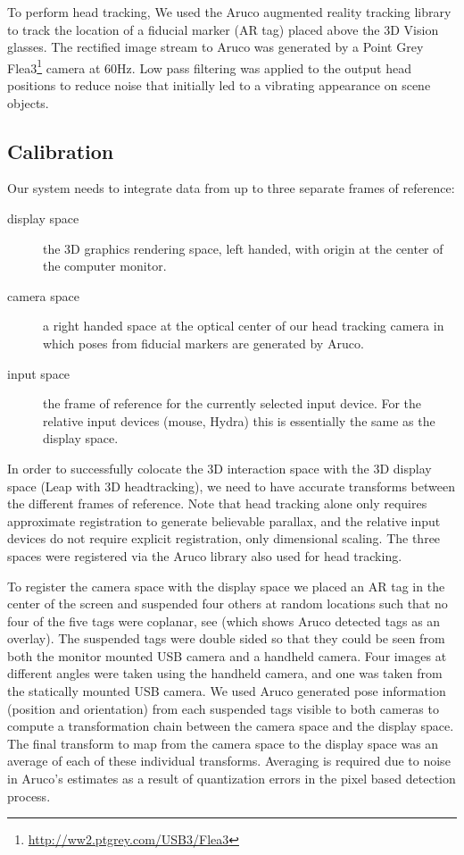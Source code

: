 To perform head tracking, We used the Aruco augmented reality tracking library
\cite{aruco} to track the location of a fiducial marker (AR tag) placed above
the 3D Vision glasses.  The rectified image stream to Aruco was generated by a
Point Grey Flea3\footnote{\url{http://ww2.ptgrey.com/USB3/Flea3}} camera at
60Hz.  Low pass filtering was applied to the output head positions to reduce
noise that initially led to a vibrating appearance on scene objects.

\subsection{Calibration}

Our system needs to integrate data from up to three separate frames of
reference:

\begin{description}

\item[display space] the 3D graphics rendering space, left handed, with origin
  at the center of the computer monitor.

\item[camera space] a right handed space at the optical center of our head
  tracking camera in which poses from fiducial markers are generated by Aruco.

\item[input space] the frame of reference for the currently selected input
  device.  For the relative input devices (mouse, Hydra) this is essentially
  the same as the display space.

\end{description}

In order to successfully colocate the 3D interaction space with the 3D display
space (Leap with 3D headtracking), we need to have accurate transforms between
the different frames of reference.  Note that head tracking alone only
requires approximate registration to generate believable parallax, and the
relative input devices do not require explicit registration, only dimensional
scaling. The three spaces were registered via the Aruco library also used for
head tracking.

To register the camera space with the display space we placed an AR tag in the
center of the screen and suspended four others at random locations such that
no four of the five tags were coplanar, see  (which shows
Aruco detected tags as an overlay).  The suspended tags were double sided so
that they could be seen from both the monitor mounted USB camera and a
handheld camera.  Four images at different angles were taken using the
handheld camera, and one was taken from the statically mounted USB camera.  We
used Aruco generated pose information (position and orientation) from each
suspended tags visible to both cameras to compute a transformation chain
between the camera space and the display space.  The final transform to map
from the camera space to the display space was an average of each of these
individual transforms.  Averaging is required due to noise in Aruco's
estimates as a result of quantization errors in the pixel based detection
process.

